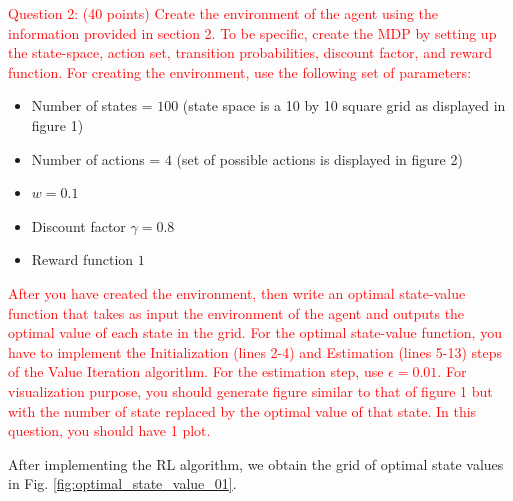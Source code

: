 \documentclass[11pt]{article}
\begin{document}
\textcolor{red}{Question 2: (40 points) Create the environment of the agent using the information provided in section 2. To be specific, create the MDP by setting up the state-space, action set, transition probabilities, discount factor, and reward
function. For creating the environment, use the following set of parameters:}
\begin{itemize}
\item Number of states = $100$ (state space is a 10 by 10 square grid as displayed
in figure 1)
\item Number of actions = $4$ (set of possible actions is displayed in figure 2)
\item $w = 0.1$
\item Discount factor $\gamma = 0.8$
\item Reward function $1$
\end{itemize}

\textcolor{red}{
    After you have created the environment, then write an optimal state-value function that takes as input the environment of the agent and outputs the optimal value of each state in the grid. For the optimal state-value function, you have to implement the Initialization (lines 2-4) and Estimation (lines 5-13) steps of the Value Iteration algorithm. For the estimation step, use $\epsilon=0.01$. For visualization purpose, you should generate figure similar to that of figure 1 but with the number of state replaced by the optimal value of that state. In this question, you should have 1 plot.
}

After implementing the RL algorithm, we obtain the grid of optimal state values in Fig. \ref{fig:optimal_state_value_01}.
\end{document}
